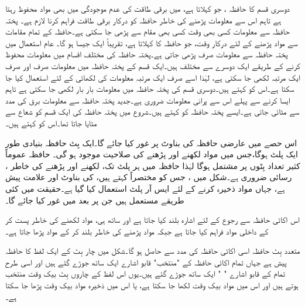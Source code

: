 دوسری قسم کا حافظہ ، جو  کہلاتا ہے،  میں برقی طاقت کی عدم موجودگی میں بھی   مواد محفوظ رہتا ہے تاہم اس سے  معلومات پڑھنے کی خاطر حافظہ کو درکار برقی طاقت فراہم کرنا لازم   ہے۔ پختہ حافظہ سے معلومات کسی بھی وقت کسی بھی  مقام سے پڑھی جا سکتی ہے۔حافظہ کے تمام مقامات سے مواد پڑھنے کے لئے درکار وقت، جو حافظہ کا کہلاتا ہے،  تقریباً ایک جیسا ہو گا۔ عام استعمال میں پختہ حافظہ سے معلومات صرف پڑھی جاتی ہے۔پختہ حافظہ کی مختلف اقسام میں معلومات محفوظ کرنے کے طریقے ایک دوسرے سے  مختلف ہیں۔ایک قسم  کے پختہ حافظہ میں معلومات صرف اور صرف ایک مرتبہ لکھی جا سکتی ہے، لہٰذا اسے صرف ایک مرتبہ معلومات کی لکھائی کے لئے استعمال کیا جا سکتا ہے۔اس کو   کہتے ہیں۔دوسری قسم کی پختہ حافظہ میں معلومات  بار بار لکھی  جا سکتی ہے تاہم ایسا کرنے سے پہلے اس  سے پرانی معلومات ضروری ہے۔جدید پختہ حافظہ سے معلومات  برق  کی مدد سے مٹائی  جاتی ہے۔ایسے پختہ حافظہ کو  کہتے ہیں۔شروع میں پختہ حافظہ کی ایک قسم کو شعاع  سے مٹایا جاتا تھا۔اس کو  کہتے ہیں۔


اس حصے  میں عارضی حافظہ کی بناوٹ پر غور کیا جائے گا۔ایک بِٹ حافظہ بنیادی طور   ایک پلٹ ہوگا،جس میں مواد لکھنے اور پڑھنے کی صلاحیت موجود ہو گی۔ حافظہ عموماً کثیر تعداد بِٹوں پر مشتمل ہوگا لہٰذا حافظہ میں ہر پلٹ  تک، لکھنے اور پڑھنے کی خاطر ،  رسائی ضروری ہے۔شکل میں ، جس کو مختصراً کہتے ہیں، کی بناوٹ اور علامت  پیش ہے، جہاں مواد ذخیرہ کرنے کے لئے ایس آر  پلٹ استعمال کیا گیا ہے۔حقیقت میں کئی طریقے مستعمل ہیں جن  پر  بعد میں غور کیا جائے گا۔ 


اس اکائی حافظہ سے رجوع کے لئے     اشارہ بلند کیا جاتا ہے اور ساتھ ہی،     مواد لکھنے کی خاطر  پست کر کے  داخلی مواد فراہم کیا جاتا ہے جبکہ  مواد پڑھنے کی خاطر    بلند کر کے مواد پڑھا جاتا ہے۔

متعدد  بِٹ حافظہ اسی اکائی حافظہ کی مدد سے حاصل  ہو گا۔شکل  میں چار بِٹ کے ایک لفظ کا حافظہ  پیش ہے جہاں تمام اکائی حافظہ کے   "منتخب" قابو اشارے ایک ساتھ جوڑے گئے ہیں اور اسی طرح تمام کے قابو  اشارے   "  " ایک ساتھ جوڑے گئے ہیں۔یوں اس لفظ کے چاروں بِٹ بیک وقت منتخب ہوتے ہیں اور اس میں مواد   بیک وقت لکھا جا سکتا ہے،  یا اس میں ذخیرہ مواد بیک وقت پڑھا جا سکتا ہے۔

